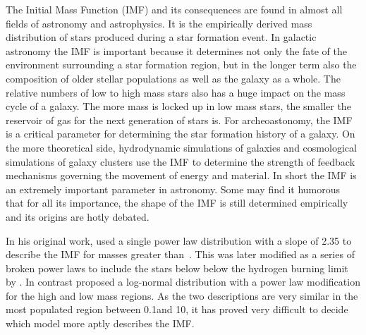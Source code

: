 The Initial Mass Function (IMF) and its consequences are found in almost all fields of astronomy and astrophysics. It is the empirically derived mass distribution of stars produced during a star formation event. In galactic astronomy the IMF is important because it determines not only the fate of the environment surrounding a star formation region, but in the longer term also the composition of older stellar populations as well as the galaxy as a whole. The relative numbers of low to high mass stars also has a huge impact on the mass cycle of a galaxy. The more mass is locked up in low mass stars, the smaller the reservoir of gas for the next generation of stars is. For archeoastonomy, the IMF is a critical parameter for determining the star formation history of a galaxy. On the more theoretical side, hydrodynamic simulations of galaxies and cosmological simulations of galaxy clusters use the IMF to determine the strength of feedback mechanisms governing the movement of energy and material. In short the IMF is an extremely important parameter in astronomy. Some may find it humorous that for all its importance, the shape of the IMF is still determined empirically and its origins are hotly debated. 

In his original work, \citet{salpeter1955} used a single power law distribution with a slope of 2.35 to describe the IMF for masses greater than \,\msun. This was later modified as a series of broken power laws to include the stars below below the hydrogen burning limit by \citet{kroupa2001}. In contrast \citet{chabrier2003} proposed a log-normal distribution with a power law modification for the high and low mass regions. As the two descriptions are very similar in the most populated region between 0.1\msun and 10\msune, it has proved very difficult to decide which model more aptly describes the IMF.

